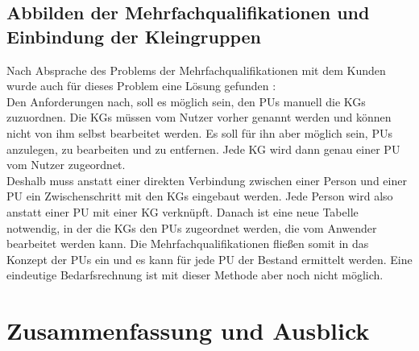 \documentclass [12pt, a4paper, oneside, titlepage, ngerman]{article}
\begin{document}
\subsection{Abbilden der Mehrfachqualifikationen und Einbindung der Kleingruppen} %
Nach Absprache des Problems der Mehrfachqualifikationen mit dem Kunden wurde auch für dieses Problem eine Lösung gefunden \cite[vgl.][]{Gespraech4}: \\
Den Anforderungen nach, soll es möglich sein, den \acp{PU} manuell die \acp{KG} zuzuordnen. Die \acp{KG} müssen vom Nutzer vorher genannt werden und können nicht von ihm selbst bearbeitet werden. Es soll für ihn aber möglich sein, \acp{PU} anzulegen, zu bearbeiten und zu entfernen. Jede \ac{KG} wird dann genau einer \ac{PU} vom Nutzer zugeordnet. \\
Deshalb muss anstatt einer direkten Verbindung zwischen einer Person und einer \ac{PU} ein Zwischenschritt mit den \acp{KG} eingebaut werden. Jede Person wird also anstatt einer \ac{PU} mit einer \ac{KG} verknüpft. Danach ist eine neue Tabelle notwendig, in der die \acp{KG} den \acp{PU} zugeordnet werden, die vom Anwender bearbeitet werden kann. Die Mehrfachqualifikationen fließen somit in das Konzept der \acp{PU} ein und es kann für jede \ac{PU} der Bestand ermittelt werden. Eine eindeutige Bedarfsrechnung ist mit dieser Methode aber noch nicht möglich. \\

\newpage

\section {Zusammenfassung und Ausblick}
\end{document}
